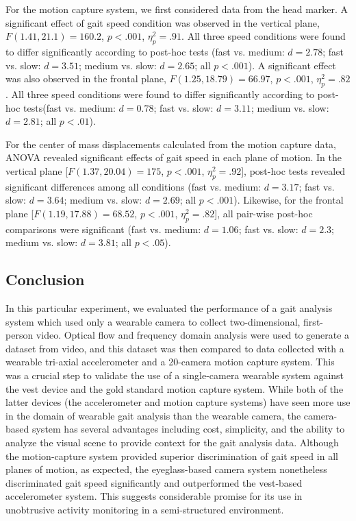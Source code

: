 \documentclass[12pt]{report}
\begin{document}
For the motion capture system, we first considered data from the head marker. A significant effect of gait speed condition was observed in the vertical plane, $F(1.41, 21.1) = 160.2$, $p < .001$, $\eta^2_p = .91$. All three speed conditions were found to differ significantly according to post-hoc tests (fast vs. medium: $d= 2.78$; fast vs. slow: $d= 3.51$; medium vs. slow: $d= 2.65$; all $p< .001$). A significant effect was also observed in the frontal plane, $F(1.25, 18.79) = 66.97$, $p < .001$, $\eta^2_p = .82$. All three speed conditions were found to differ significantly according to post-hoc tests(fast vs. medium: $d= 0.78$; fast vs. slow: $d= 3.11$; medium vs. slow: $d= 2.81$; all $p< .01$).
 
For the center of mass displacements calculated from the motion capture data, ANOVA revealed significant effects of gait speed in each plane of motion. In the vertical plane [$F(1.37,20.04) = 175$, $p < .001$, $\eta^2_p = .92$], post-hoc tests revealed significant differences among all conditions (fast vs. medium: $d= 3.17$; fast vs. slow: $d= 3.64$; medium vs. slow: $d= 2.69$; all $p< .001$). Likewise, for the frontal plane [$F(1.19,17.88) = 68.52$, $p< .001$, $\eta^2_p = .82$], all pair-wise post-hoc comparisons were significant (fast vs. medium: $d= 1.06$; fast vs. slow: $d= 2.3$; medium vs. slow: $d= 3.81$; all $p< .05$).

\subsection{Conclusion}
In this particular experiment, we evaluated the performance of a gait analysis system which used only a wearable camera to collect two-dimensional, first-person video. Optical flow and frequency domain analysis were used to generate a dataset from video, and this dataset was then compared to data collected with a wearable tri-axial accelerometer and a 20-camera motion capture system. This was a crucial step to validate the use of a single-camera wearable system against the vest device and the gold standard motion capture system. While both of the latter devices (the accelerometer and motion capture systems) have seen more use in the domain of wearable gait analysis than the wearable camera, the camera-based system has several advantages including cost, simplicity, and the ability to analyze the visual scene to provide context for the gait analysis data. Although the motion-capture system provided superior discrimination of gait speed in all planes of motion, as expected, the eyeglass-based camera system nonetheless discriminated gait speed significantly and outperformed the vest-based accelerometer system. This suggests considerable promise for its use in unobtrusive activity monitoring in a semi-structured environment.
\end{document}
